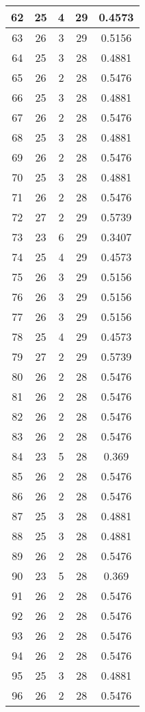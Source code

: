 \documentclass[letterpaper, 12pt]{article}
\begin{document}
\begin{longtable}{|c|c|c|c|c|}
\hline
62 & 25 & 4 & 29 & 0.4573 \\
\hline
63 & 26 & 3 & 29 & 0.5156 \\
\hline
64 & 25 & 3 & 28 & 0.4881 \\
\hline
65 & 26 & 2 & 28 & 0.5476 \\
\hline
66 & 25 & 3 & 28 & 0.4881 \\
\hline
67 & 26 & 2 & 28 & 0.5476 \\
\hline
68 & 25 & 3 & 28 & 0.4881 \\
\hline
69 & 26 & 2 & 28 & 0.5476 \\
\hline
70 & 25 & 3 & 28 & 0.4881 \\
\hline
71 & 26 & 2 & 28 & 0.5476 \\
\hline
72 & 27 & 2 & 29 & 0.5739 \\
\hline
73 & 23 & 6 & 29 & 0.3407 \\
\hline
74 & 25 & 4 & 29 & 0.4573 \\
\hline
75 & 26 & 3 & 29 & 0.5156 \\
\hline
76 & 26 & 3 & 29 & 0.5156 \\
\hline
77 & 26 & 3 & 29 & 0.5156 \\
\hline
78 & 25 & 4 & 29 & 0.4573 \\
\hline
79 & 27 & 2 & 29 & 0.5739 \\
\hline
80 & 26 & 2 & 28 & 0.5476 \\
\hline
81 & 26 & 2 & 28 & 0.5476 \\
\hline
82 & 26 & 2 & 28 & 0.5476 \\
\hline
83 & 26 & 2 & 28 & 0.5476 \\
\hline
84 & 23 & 5 & 28 & 0.369 \\
\hline
85 & 26 & 2 & 28 & 0.5476 \\
\hline
86 & 26 & 2 & 28 & 0.5476 \\
\hline
87 & 25 & 3 & 28 & 0.4881 \\
\hline
88 & 25 & 3 & 28 & 0.4881 \\
\hline
89 & 26 & 2 & 28 & 0.5476 \\
\hline
90 & 23 & 5 & 28 & 0.369 \\
\hline
91 & 26 & 2 & 28 & 0.5476 \\
\hline
92 & 26 & 2 & 28 & 0.5476 \\
\hline
93 & 26 & 2 & 28 & 0.5476 \\
\hline
94 & 26 & 2 & 28 & 0.5476 \\
\hline
95 & 25 & 3 & 28 & 0.4881 \\
\hline
96 & 26 & 2 & 28 & 0.5476 \\

\end{longtable}
\end{document}
